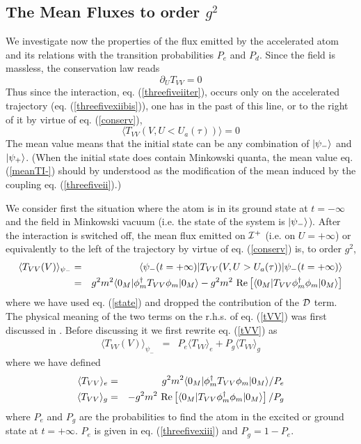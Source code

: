\documentclass[12pt]{article}
\begin{document}
\subsection{The Mean Fluxes to order $g^2$}

We investigate now the properties of the flux emitted by the accelerated atom
and its relations with the transition probabilities $P_e$ and $P_d$.
Since the field is massless, the conservation law reads
\begin{equation}
\partial_U T_{VV} =0
\label{conserv}
\end{equation}
Thus since the interaction, eq. (\ref{threefiveiiter}),
 occurs only on the accelerated trajectory (eq. (\ref{threefivexiibis})),
 one has in the past of this line,
 or to the right of it by virtue of eq. (\ref{conserv}),
\begin{equation}
\langle T_{VV}(V, U<U_a(\tau)) \rangle =0
\label{meanTI-}
\end{equation}
The mean value means that the initial state can be any combination
of $\mbox{$ \vert \psi_- \rangle $}$ and $\mbox{$ \vert \psi_+ \rangle $}$. (When the initial state does contain
Minkowski quanta, the mean value
eq. (\ref{meanTI-}) should by understood as the modification of the
mean induced by the coupling eq. (\ref{threefiveii}).)

 We consider first the situation where
the atom is in its ground state at $t=-\infty$ and the field
in Minkowski vacuum (i.e. the state of the
system is $\mbox{$ \vert \psi_- \rangle $}$). After the interaction is switched off,
the mean flux emitted on ${\cal{I}}^+$
(i.e. on $U= + \infty$) or equivalently to
the
left of the trajectory by virtue of eq. (\ref{conserv})
 is, to order $g^2$,
\begin{eqnarray}
\langle T_{VV}(V) \rangle_{\psi_-} &=&
\mbox{$ \langle \psi_-(t=+\infty) \vert $} T_{VV}(V, U>U_a(\tau)) \mbox{$ \vert \psi_-(t=+\infty) \rangle $}
\nonumber\\
&=&
g^2m^2 \mbox{$ \langle 0_M \vert $} \phi_m^\dagger T_{VV} \phi_m \mbox{$ \vert 0_M \rangle $}
-  g^2m^2\mbox{ Re}\left[
 \mbox{$ \langle 0_M \vert $}  T_{VV} \phi_m^\dagger \phi_m \mbox{$ \vert 0_M \rangle $} \right]
\label{tVV}
\end{eqnarray}
where we have used eq. (\ref{state}) and dropped the contribution of the
$\cal{D}
$ term.
The physical meaning of the two terms on the r.h.s. of eq. (\ref{tVV})
was first discussed in \cite{UnWa}.
Before discussing it we first
rewrite
eq. (\ref{tVV}) as
\begin{eqnarray}
\langle T_{VV}(V) \rangle_{\psi_-} &=&
P_e \langle T_{VV} \rangle _{e}
+  P_g \langle T_{VV} \rangle _{g}
\label{tVVB}
\end{eqnarray}
where we
have defined
\begin{eqnarray}
\langle T_{VV}\rangle _{e}
 &=& g^2m^2 \mbox{$ \langle 0_M \vert $} \phi_m^\dagger T_{VV} \phi_m
\mbox{$ \vert 0_M \rangle $}/ P_e\nonumber\\
\langle T_{VV}\rangle _{g}
&=& - g^2m^2\mbox{ Re}\left[
 \mbox{$ \langle 0_M \vert $}  T_{VV} \phi_m^\dagger \phi_m \mbox{$ \vert 0_M \rangle $} \right]/ P_g
\label{45b}
\end{eqnarray}
where $P_e$ and $P_g$ are the probabilities to find the atom
in the excited
or ground state at $t=+\infty$.  $P_e$ is given in eq. (\ref{threefivexiii})
and $P_g
=1-P_e$.
\end{document}
